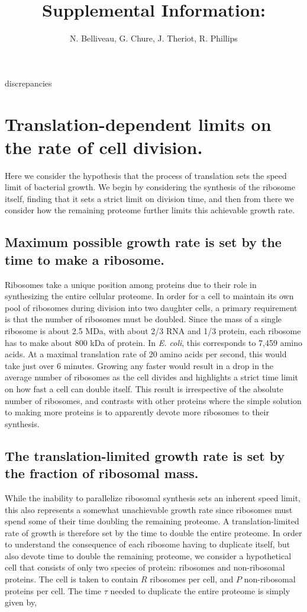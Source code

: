 discrepancies \documentclass[11pt, letterpaper]{article}
\author{N. Belliveau, G. Chure, J. Theriot, R. Phillips}
\begin{document}
\title{Supplemental Information: }
\maketitle

\section{Translation-dependent limits on the rate of cell division.}

Here we consider the hypothesis that the process of translation sets the speed
limit of bacterial growth. We begin by considering the synthesis of the ribosome
itself, finding that it sets a strict limit on division time, and then from there we
consider how the remaining proteome further limits this achievable growth rate.

\subsection{Maximum possible growth rate is set by the time to make a ribosome.}

Ribosomes take a unique position among proteins due to their role in
synthesizing the entire cellular proteome. In order for a cell to maintain its
own pool of ribosomes during division into two daughter cells, a primary
requirement is that the number of ribosomes must be doubled.  Since the  mass of
a single ribosome is about 2.5 MDa, with about 2/3 RNA and 1/3 protein, each
ribosome has to make about 800 kDa of protein. In {\it E. coli},
this corresponds to 7,459 amino acids. At a maximal translation rate of 20 amino
acids per second, this would take just over 6 minutes.  Growing any faster would
result in a drop in the average number of ribosomes as the cell divides and
highlights a strict time limit on how fast a cell can double itself.  This
result is irrespective of the absolute number of ribosomes, and contrasts with
other proteins where the simple solution to making more proteins is to
apparently devote more ribosomes to their synthesis.

\subsection{The translation-limited growth rate is set by the fraction of
ribosomal mass.}

While the inability to parallelize ribosomal synthesis sets an inherent speed
limit, this also represents a somewhat unachievable growth rate since ribosomes must
spend some of their time doubling the remaining proteome. A
translation-limited rate of growth is therefore set by the time to double the
entire proteome. In order to understand the consequence of each ribosome having
to duplicate itself, but also devote time to double the remaining proteome, we
consider a hypothetical cell that consists of only two species of protein:
ribosomes and non-ribosomal proteins. The cell is taken to contain $R$ ribosomes
per cell, and $P$ non-ribosomal proteins per cell. The time $\tau$ needed to
duplicate the entire proteome is simply given by,
\end{document}
